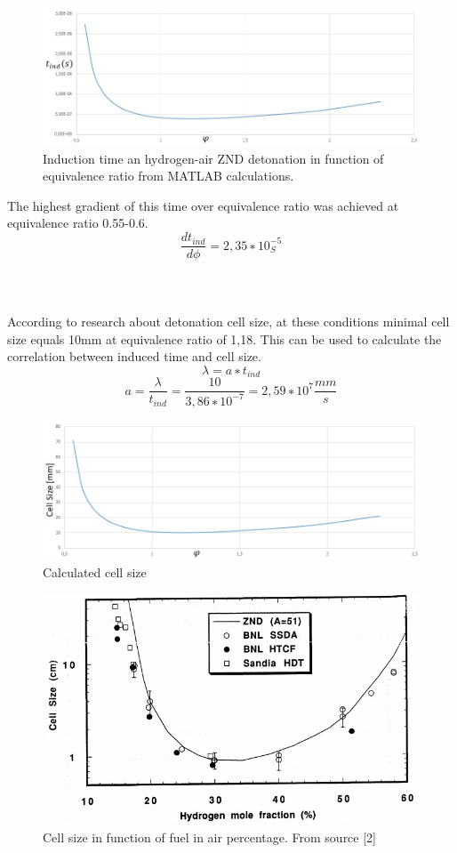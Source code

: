 \documentclass[a4paper]{article}
\begin{document}
\begin{figure}[h!]
\includegraphics[width=1\textwidth]{3.jpg}
\caption{\label{fig:3}Induction time an hydrogen-air ZND detonation in function of equivalence ratio from MATLAB calculations.}
\end{figure}



The highest gradient of this time over equivalence ratio was  achieved at equivalence ratio 0.55-0.6.
$$\frac{dt_{ind}}{d\phi}=2,35∗10^{−5} _S$$
\\
\\
\\
According to research about detonation cell size, at these conditions minimal cell size equals 10mm at equivalence ratio of 1,18. This can be used to calculate the correlation between induced time and cell size.
$$\lambda =a ∗ t_{ind}$$
$$ a=\frac{\lambda}{t_{ind}}=\frac{10}{3,86∗10^{−7}}=2,59∗10^7 \frac{mm}{s}$$

\begin{figure}[h!]
\includegraphics[width=1\textwidth]{4.jpg}
\caption{\label{fig:4}Calculated cell size}
\end{figure}

\begin{figure}[h!]
\includegraphics[width=1\textwidth]{5.jpg}
\caption{\label{fig:5}Cell size in function of fuel in air percentage. From source [2]}
\end{figure}
\newpage
\end{document}
